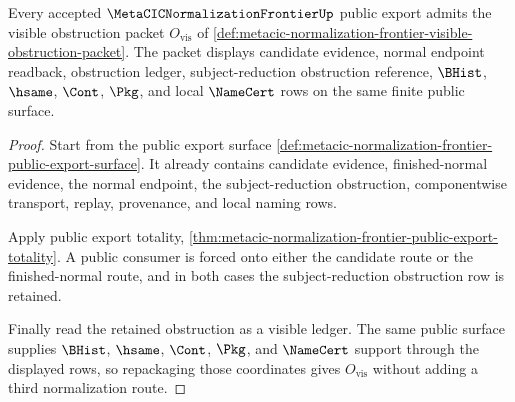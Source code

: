 \begin{theorem}
\label{thm:metacic-normalization-frontier-visible-obstruction-admission}
Every accepted $\MetaCICNormalizationFrontierUp$ public export admits the
visible obstruction packet $O_{\mathrm{vis}}$ of
\autoref{def:metacic-normalization-frontier-visible-obstruction-packet}. The
packet displays candidate evidence, normal endpoint readback, obstruction
ledger, subject-reduction obstruction reference, $\BHist$, $\hsame$, $\Cont$,
$\Pkg$, and local $\NameCert$ rows on the same finite public surface.
\end{theorem}
\begin{proof}
Start from the public export surface
\autoref{def:metacic-normalization-frontier-public-export-surface}. It already
contains candidate evidence, finished-normal evidence, the normal endpoint,
the subject-reduction obstruction, componentwise transport, replay, provenance,
and local naming rows.

Apply public export totality,
\autoref{thm:metacic-normalization-frontier-public-export-totality}. A public
consumer is forced onto either the candidate route or the finished-normal
route, and in both cases the subject-reduction obstruction row is retained.

Finally read the retained obstruction as a visible ledger. The same public
surface supplies $\BHist$, $\hsame$, $\Cont$, $\Pkg$, and $\NameCert$ support
through the displayed rows, so repackaging those coordinates gives
$O_{\mathrm{vis}}$ without adding a third normalization route.
\end{proof}

